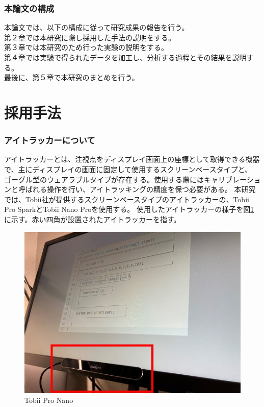 \documentclass[paper=a4paper,fontsize=11pt]{jlreq}
\begin{document}
  \section{本論文の構成}
    本論文では、以下の構成に従って研究成果の報告を行う。\\
    第２章では本研究に際し採用した手法の説明をする。\\
    第３章では本研究のため行った実験の説明をする。\\
    第４章では実験で得られたデータを加工し、分析する過程とその結果を説明する。\\
    最後に、第５章で本研究のまとめを行う。

\clearpage

\part{採用手法}
  \section{アイトラッカーについて}
    アイトラッカーとは、注視点をディスプレイ画面上の座標として取得できる機器で、主にディスプレイの画面に固定して使用するスクリーンベースタイプと、
    ゴーグル型のウェアラブルタイプが存在する。使用する際にはキャリブレーションと呼ばれる操作を行い、アイトラッキングの精度を保つ必要がある。
    本研究では、Tobii社が提供するスクリーンベースタイプのアイトラッカーの、Tobii Pro Spark\cite{spark}とTobii Nano Pro\cite{nano}を使用する。
    使用したアイトラッカーの様子を図\ref{tobii_nano}に示す。赤い四角が設置されたアイトラッカーを指す。
    \begin{figure}[htbp]
      \centering
      \includegraphics[width=0.8\linewidth]{tobii_nano.jpg}
      \caption{Tobii Pro Nano}
      \label{tobii_nano}
    \end{figure}
    \FloatBarrier
    \clearpage
\end{document}
